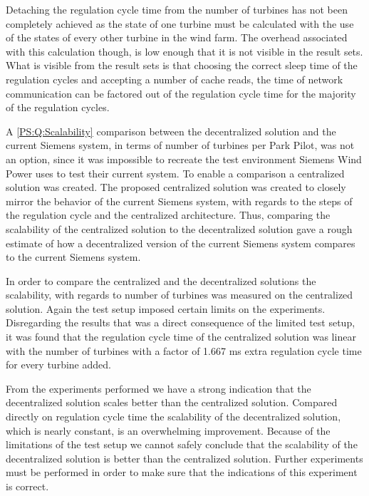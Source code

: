 Detaching the regulation cycle time from the number of turbines has not been completely achieved as the state of one turbine must be calculated with the use of the states of every other turbine in the wind farm. The overhead associated with this calculation though, is low enough that it is not visible in the result sets. What is visible from the result sets is that choosing the correct sleep time of the regulation cycles and accepting a number of cache reads, the time of network communication can be factored out of the regulation cycle time for the majority of the regulation cycles.

A \ref{PS:Q:Scalability} comparison between the decentralized solution and the current Siemens system, in terms of number of turbines per Park Pilot, was not an option, since it was impossible to recreate the test environment Siemens Wind Power uses to test their current system. To enable a comparison a centralized solution was created. The proposed centralized solution was created to closely mirror the behavior of the current Siemens system, with regards to the steps of the regulation cycle and the centralized architecture. Thus, comparing the scalability of the centralized solution to the decentralized solution gave a rough estimate of how a decentralized version of the current Siemens system compares to the current Siemens system.

In order to compare the centralized and the decentralized solutions the scalability, with regards to number of turbines was measured on the centralized solution. Again the test setup imposed certain limits on the experiments. Disregarding the results that was a direct consequence of the limited test setup, it was found that the regulation cycle time of the centralized solution was linear with the number of turbines with a factor of 1.667 ms extra regulation cycle time for every turbine added.

From the experiments performed we have a strong indication that the decentralized solution scales better than the centralized solution. Compared directly on regulation cycle time the scalability of the decentralized solution, which is nearly constant, is an overwhelming improvement. Because of the limitations of the test setup we cannot safely conclude that the scalability of the decentralized solution is better than the centralized solution. Further experiments must be performed in order to make sure that the indications of this experiment is correct.

